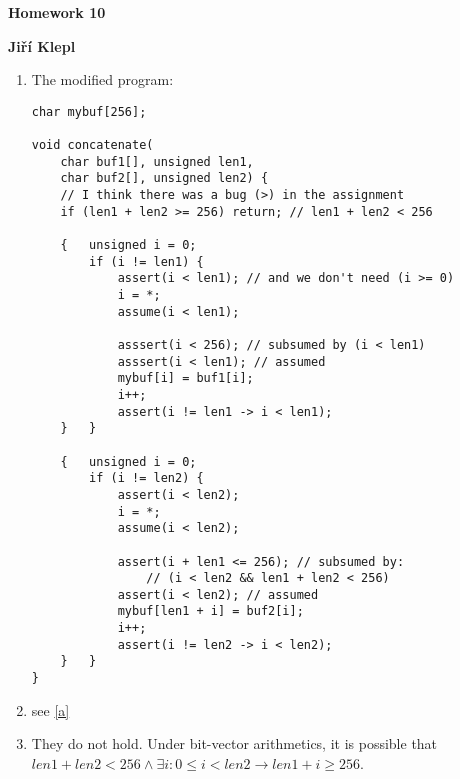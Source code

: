 \documentclass[a4paper,12pt]{article} %
\begin{document}
\begin{center}
    {\Large \bf Homework 10}
    \vspace{2mm}

    {\bf Jiří Klepl}

\end{center}

\vspace{0.4cm}

\begin{enumerate}[label=\alph*)]
    \item \label{a} The modified program:
    \begin{lstlisting}
char mybuf[256];

void concatenate(
    char buf1[], unsigned len1,
    char buf2[], unsigned len2) {
    // I think there was a bug (>) in the assignment
    if (len1 + len2 >= 256) return; // len1 + len2 < 256

    {   unsigned i = 0;
        if (i != len1) {
            assert(i < len1); // and we don't need (i >= 0)
            i = *;
            assume(i < len1);

            asssert(i < 256); // subsumed by (i < len1)
            asssert(i < len1); // assumed
            mybuf[i] = buf1[i];
            i++;
            assert(i != len1 -> i < len1);
    }   }

    {   unsigned i = 0;
        if (i != len2) {
            assert(i < len2);
            i = *;
            assume(i < len2);

            assert(i + len1 <= 256); // subsumed by:
                // (i < len2 && len1 + len2 < 256)
            assert(i < len2); // assumed
            mybuf[len1 + i] = buf2[i];
            i++;
            assert(i != len2 -> i < len2);
    }   }
}
    \end{lstlisting}
    \item see \ref{a}
    \item They do not hold. Under bit-vector arithmetics, it is possible that $len1 + len2 < 256 \land \exists i: 0 \leq i < len2 \to len1 + i \geq 256$.
\end{enumerate}
\end{document}
